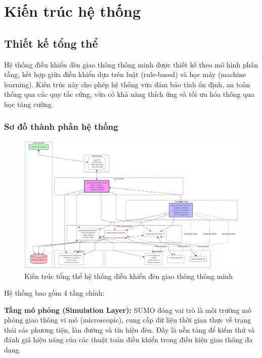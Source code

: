 \chapter{Kiến trúc hệ thống}

\section{Thiết kế tổng thể}

Hệ thống điều khiển đèn giao thông thông minh được thiết kế theo mô hình phân tầng, kết hợp giữa điều khiển dựa trên luật (rule-based) và học máy (machine learning). Kiến trúc này cho phép hệ thống vừa đảm bảo tính ổn định, an toàn thông qua các quy tắc cứng, vừa có khả năng thích ứng và tối ưu hóa thông qua học tăng cường.

\subsection{Sơ đồ thành phần hệ thống}

\begin{figure}[H]
    \centering
    \includegraphics[width=1\linewidth]{Untitled diagram _ Mermaid Chart-2025-08-21-023904.png}

    
    \caption{Kiến trúc tổng thể hệ thống điều khiển đèn giao thông thông minh}
    \label{fig:system_architecture}
\end{figure}

Hệ thống bao gồm 4 tầng chính:

\textbf{Tầng mô phỏng (Simulation Layer):} SUMO đóng vai trò là môi trường mô phỏng giao thông vi mô (microscopic), cung cấp dữ liệu thời gian thực về trạng thái các phương tiện, làn đường và tín hiệu đèn. Đây là nền tảng để kiểm thử và đánh giá hiệu năng của các thuật toán điều khiển trong điều kiện giao thông đa dạng.

